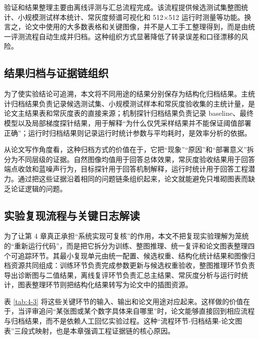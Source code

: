 \documentclass[thesis]{../zstucs-graduation-project}
\begin{document}
验证和结果整理主要由离线评测与汇总流程完成。该流程提供候选测试集整图统计、小规模测试样本统计、常灰度频谱可视化和 512\(\times\)512 运行时测量等功能。换言之，论文中使用的大多数表格和关键图像，并不是人工手工整理得到，而是由统一评测流程自动生成并归档。这种组织方式显著降低了转录误差和口径漂移的风险。

\subsection{结果归档与证据链组织}
为了使实验结论可追溯，本文将不同用途的结果分别保存为结构化归档结果。主统计归档结果负责记录候选测试集、小规模测试样本和常灰度验收集的主统计量，是论文主结果表和常灰度表的直接来源；机制探针归档结果负责记录 baseline、最终模型以及局部梯度探针结果，用于解释“为什么仅凭采样结果并不能保证阈值部署正确”；运行时归档结果则记录运行时统计参数与平均耗时，是效率分析的依据。

从论文写作角度看，这种归档方式的价值在于，它把“现象”“原因”和“部署意义”拆分为不同层级的证据。自然图像均值用于回答总体效果，常灰度验收结果用于回答端点收敛和蓝噪声行为，目标探针用于回答机制解释，运行时统计用于回答工程潜力。通过把这些证据沿着相同的问题链条组织起来，论文就能避免只堆砌图表而缺乏论证逻辑的问题。

\subsection{实验复现流程与关键日志解读}
为了让第 4 章真正承担“系统实现可复核”的作用，本文不把复现实验理解为笼统的“重新运行代码”，而是把它拆分为训练、整图推理、统一复评和论文图表整理四个可追踪环节。其最小复现单元由统一配置、候选权重、结构化统计结果和图像归档资源共同组成：训练环节负责完成参数更新与候选权重验收，整图推理环节负责导出诊断图与二值结果，离线复评环节负责汇总主结果、常灰度分析与运行时统计，图表整理环节则把结构化结果转写为论文中的插图资源。

表 \ref{tab:4-3} 将这些关键环节的输入、输出和论文用途对应起来。这样做的价值在于，当评审追问“某张图或某个数字具体来自哪里”时，论文能够直接回到相应流程与归档结果，而不是依赖人工回忆实验过程。这种“流程环节-归档结果-论文图表”三段式映射，也是本章强调工程证据链的核心原因。
\end{document}
